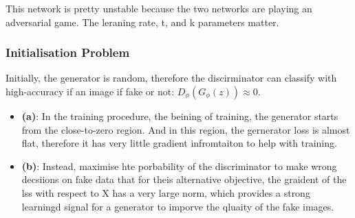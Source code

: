 \documentclass[11pt]{article}
\begin{document}
This network is pretty unstable because the two networks are playing an adversarial game. The leraning rate, t, and k parameters matter.

\subsubsection{Initialisation Problem}

Initially, the generator is random, therefore the discirminator can classify with high-accuracy if an image if fake or not: $D_\phi(G_\phi(z))\approx 0$.

\begin{figure}[H]
    \centering
\end{figure}

\begin{itemize}
    \item \textbf{(a)}: In the training procedure, the beining of training, the generator starts from the close-to-zero region. And in this region, the gernerator loss is almost flat, therefore it has very little gradient infromtaiton to help with training.
    \item \textbf{(b)}: Instead, maximise hte porbability of the discriminator to make wrong decsiions on fake data that for theis alternative objective, the graident of the lss with respect to X has a very large norm, which provides a strong learningd signal for a generator to imporve the qluaity of the fake images.
\end{itemize}
\end{document}
